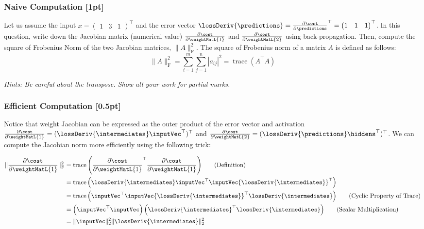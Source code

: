 \subsubsection{Naive Computation {\color{blue}[1pt]} \LIII}
Let us assume the input $x=\begin{pmatrix} 1 & 3 & 1 \end{pmatrix}^{\top}$ and the error vector $\lossDeriv{\predictions}= \frac{\partial \cost}{\partial \predictions}^{\top} = {\begin{pmatrix} 1 & 1 & 1 \end{pmatrix}}^{\top}$. In this question, write down the Jacobian matrix (numerical value) $\frac{\partial \cost}{\partial \weightMatL{1}}$ and $\frac{\partial \cost}{\partial \weightMatL{2}}$ using back-propagation. Then, compute the square of Frobenius Norm of the two Jacobian matrices, $\|A\|^2_{\mathrm{F}}$. The square of Frobenius norm of a matrix $A$ is defined as follows:
$$
\|A\|^2_{\mathrm{F}}={\sum_{i=1}^{m} \sum_{j=1}^{n}\left|a_{i j}\right|^{2}}={\operatorname{trace}\left(A^{\top} A\right)}
$$

\noindent \emph{Hints: Be careful about the transpose. Show all your work for partial marks.}


\subsubsection{Efficient Computation {\color{blue}[0.5pt]} \LIII}
Notice that weight Jacobian can be expressed as the outer product of the error vector and activation $\frac{\partial \cost}{\partial \weightMatL{1}} = (\lossDeriv{\intermediates} \inputVec^{\top})^{\top}$ and $\frac{\partial \cost}{\partial \weightMatL{2}} = (\lossDeriv{\predictions} \hiddens^{\top})^{\top}$. We can compute the Jacobian norm more efficiently using the following trick:

\begin{align*}
    \|\frac{\partial \cost}{\partial \weightMatL{1}}\|^2_{\mathrm{F}} &={\operatorname{trace}\left({\frac{\partial \cost}{\partial \weightMatL{1}}}^{\top} \frac{\partial \cost}{\partial \weightMatL{1}} \right)} \qquad (\text{Definition}) \\
    &= {\operatorname{trace}\left(\lossDeriv{\intermediates} \inputVec^{\top} \inputVec {\lossDeriv{\intermediates}}^{\top} \right)} \\
    &= {\operatorname{trace}\left({\inputVec}^{\top} \inputVec {\lossDeriv{\intermediates}}^{\top} \lossDeriv{\intermediates} \right)} \qquad (\text{Cyclic Property of Trace}) \\
    &= {\left({\inputVec}^{\top} \inputVec \right) \left({\lossDeriv{\intermediates}}^{\top} \lossDeriv{\intermediates} \right)} \qquad (\text{Scalar Multiplication})\\
    &= \|\inputVec\|^2_2 \|\lossDeriv{\intermediates}\|^2_2
\end{align*} \\

